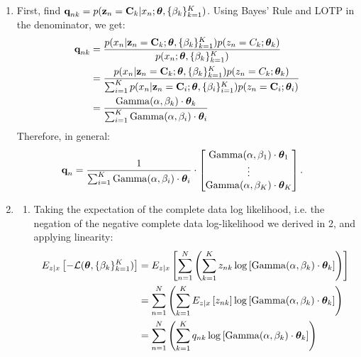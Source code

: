 \documentclass[submit]{harvardml}
\begin{document}
\begin{enumerate}
  \item
  First, find $\textbf{q}_{nk} = p(\mathbf{z}_n =\mathbf{C}_k| x_n; \boldsymbol{\theta}, \{ \beta_k \}^K_{k=1})$. Using Bayes' Rule and LOTP in the denominator, we get:
  \begin{align*}
      \textbf{q}_{nk} &= \frac{p(x_n | \mathbf{z}_n =\mathbf{C}_k; \boldsymbol{\theta}, \{ \beta_k \}^K_{k=1}) p(z_n = C_k; \boldsymbol{\theta}_k)}{p(x_n; \boldsymbol{\theta}, \{ \beta_k \}^K_{k=1})}\\
      &= \frac{p(x_n | \mathbf{z}_n =\mathbf{C}_k; \boldsymbol{\theta}, \{ \beta_k \}^K_{k=1}) p(z_n = C_k; \boldsymbol{\theta}_k)}{\sum_{i=1}^K p(x_n | \mathbf{z}_n =\mathbf{C}_i; \boldsymbol{\theta}, \{ \beta_i \}^K_{i=1}) p(z_n = \mathbf{C}_i; \boldsymbol{\theta}_i)}\\
      &= \frac{\operatorname{Gamma}(\alpha, \beta_k) \cdot \boldsymbol{\theta}_k}{\sum_{i=1}^K \operatorname{Gamma}(\alpha, \beta_i) \cdot \boldsymbol{\theta}_i}
  \end{align*}
  Therefore, in general:
  \begin{align*}
    \textbf{q}_n &= \frac{1}{\sum_{i=1}^K \operatorname{Gamma}(\alpha, \beta_i) \cdot \boldsymbol{\theta}_i} \cdot \begin{bmatrix}
      \operatorname{Gamma}(\alpha, \beta_1) \cdot \boldsymbol{\theta}_1 \\
      \vdots \\
      \operatorname{Gamma}(\alpha, \beta_K) \cdot \boldsymbol{\theta}_K
    \end{bmatrix}.
  \end{align*}
  
  \item 
    \begin{enumerate}
      \item
      Taking the expectation of the complete data log likelihood, i.e. the negation of the negative complete data log-likelihood we derived in 2, and applying linearity:
      \begin{align*}
          E_{z|x}\left[-\mathcal{L}(\boldsymbol{\theta}, \{\beta_k\}^K_{k=1}) \right] &= E_{z|x}\left[\sum_{n=1}^N \left(\sum_{k=1}^K z_{nk}\log \left[\operatorname{Gamma}(\alpha, \beta_k) \cdot \boldsymbol{\theta}_k\right]\right)\right]\\
          &= \sum_{n=1}^N \left(\sum_{k=1}^K E_{z|x}\left[z_{nk}\right] \log \left[\operatorname{Gamma}(\alpha, \beta_k) \cdot \boldsymbol{\theta}_k\right]\right)\\
          &= \sum_{n=1}^N \left(\sum_{k=1}^K q_{nk} \log \left[\operatorname{Gamma}(\alpha, \beta_k) \cdot \boldsymbol{\theta}_k\right]\right)
      \end{align*}
      

\end{enumerate}
\end{enumerate}
\end{document}
